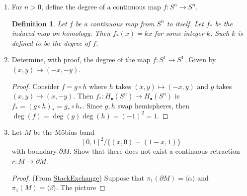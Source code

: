 \documentclass{article}
\newtheorem*{definition}{Definition}
\begin{document}
\begin{enumerate}
\begin{proof}
		Since $U,V$ are simply connected, they have trivial $pi_1$. 
		$H_1$ is the abelianization of $\pi_1$, and so since the trivial group is abelian, we have
		$H_1(U) \otimes H_1(V) = 0 \otimes 0 \cong 0$.
		
		We are also given that $H_1(U \cap V) \neq 0$.
		
		Thus, the map $H_1(U \cap V) \rightarrow 0$ is the zero map. Then exactness of the sequence tells us that
		 ${H_2(X) \rightarrow H_1(U \cap V) \neq 0}$ is a surjection. This shows that $H_2(X)$ is nontrivial, since the map
		 ${0 \rightarrow H_1(U\cap V) \neq 0}$ can never be a surjection.
	\end{proof}
	
	\item For $n > 0$, define the degree of a continuous map $f: S^n \rightarrow S^n$.
	
	\begin{definition}
		Let $f$ be a continuous map from $S^n$ to itself. 
		Let $f_*$ be the induced map on homology. Then $f_*(x) = kx$ for some integer $k$.
		Such $k$ is defined to be the degree of $f$.
	\end{definition}
	
	\item Determine, with proof, the degree of the map $f: S^1 \rightarrow S^1$. Given by $(x,y) \mapsto (-x,-y)$.
	
	\begin{proof}
		Consider $f = g \circ h$ where $h$ takes $(x,y) \mapsto (-x,y)$ and $g$ takes $(x,y) \mapsto (x,-y)$.
		Then $f_*: H_\bullet(S^n) \rightarrow H_\bullet (S^n)$ is $f_* = (g \circ h)_* = g_* \circ h_*$.
		Since $g,h$ swap hemispheres, then $\deg (f) = \deg(g)\deg(h) = (-1)^2 = 1$.
	\end{proof}
	
	\setcounter{enumi}{7}
	
	\item Let $M$ be the M\"obius band
	\[ [0,1]^2 / \{(x,0) \sim (1-x,1)\}\]
	with boundary $\partial M$. Show that there does not exist a continuous retraction $r:M \rightarrow \partial M$.
	
	\begin{proof}{(From \href{https://math.stackexchange.com/questions/202447/retraction-of-the-m\%C3\%B6bius-strip-to-its-boundary}{StackExchange})}
	Suppose that $\pi_1(\partial M) = \langle \alpha \rangle$ and $\pi_1(M) = \langle \beta \rangle$. The picture
	

\end{proof}
\end{enumerate}
\end{document}
